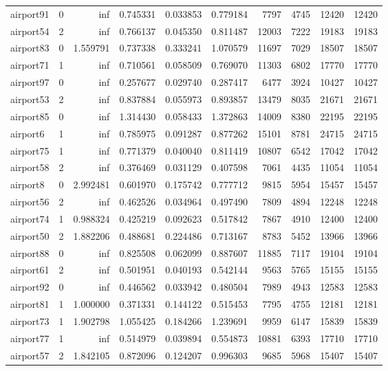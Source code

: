 \begin{longtable}{|l|r|r|r|r|r|r|r|r|r|}
airport91 & 0 & inf & 0.745331 & 0.033853 & 0.779184 & 7797 & 4745 & 12420 & 12420 \\
airport54 & 2 & inf & 0.766137 & 0.045350 & 0.811487 & 12003 & 7222 & 19183 & 19183 \\
airport83 & 0 & 1.559791 & 0.737338 & 0.333241 & 1.070579 & 11697 & 7029 & 18507 & 18507 \\
airport71 & 1 & inf & 0.710561 & 0.058509 & 0.769070 & 11303 & 6802 & 17770 & 17770 \\
airport97 & 0 & inf & 0.257677 & 0.029740 & 0.287417 & 6477 & 3924 & 10427 & 10427 \\
airport53 & 2 & inf & 0.837884 & 0.055973 & 0.893857 & 13479 & 8035 & 21671 & 21671 \\
airport85 & 0 & inf & 1.314430 & 0.058433 & 1.372863 & 14009 & 8380 & 22195 & 22195 \\
airport6 & 1 & inf & 0.785975 & 0.091287 & 0.877262 & 15101 & 8781 & 24715 & 24715 \\
airport75 & 1 & inf & 0.771379 & 0.040040 & 0.811419 & 10807 & 6542 & 17042 & 17042 \\
airport58 & 2 & inf & 0.376469 & 0.031129 & 0.407598 & 7061 & 4435 & 11054 & 11054 \\
airport8 & 0 & 2.992481 & 0.601970 & 0.175742 & 0.777712 & 9815 & 5954 & 15457 & 15457 \\
airport56 & 2 & inf & 0.462526 & 0.034964 & 0.497490 & 7809 & 4894 & 12248 & 12248 \\
airport74 & 1 & 0.988324 & 0.425219 & 0.092623 & 0.517842 & 7867 & 4910 & 12400 & 12400 \\
airport50 & 2 & 1.882206 & 0.488681 & 0.224486 & 0.713167 & 8783 & 5452 & 13966 & 13966 \\
airport88 & 0 & inf & 0.825508 & 0.062099 & 0.887607 & 11885 & 7117 & 19104 & 19104 \\
airport61 & 2 & inf & 0.501951 & 0.040193 & 0.542144 & 9563 & 5765 & 15155 & 15155 \\
airport92 & 0 & inf & 0.446562 & 0.033942 & 0.480504 & 7989 & 4943 & 12583 & 12583 \\
airport81 & 1 & 1.000000 & 0.371331 & 0.144122 & 0.515453 & 7795 & 4755 & 12181 & 12181 \\
airport73 & 1 & 1.902798 & 1.055425 & 0.184266 & 1.239691 & 9959 & 6147 & 15839 & 15839 \\
airport77 & 1 & inf & 0.514979 & 0.039894 & 0.554873 & 10881 & 6393 & 17710 & 17710 \\
airport57 & 2 & 1.842105 & 0.872096 & 0.124207 & 0.996303 & 9685 & 5968 & 15407 & 15407 \\

\end{longtable}
